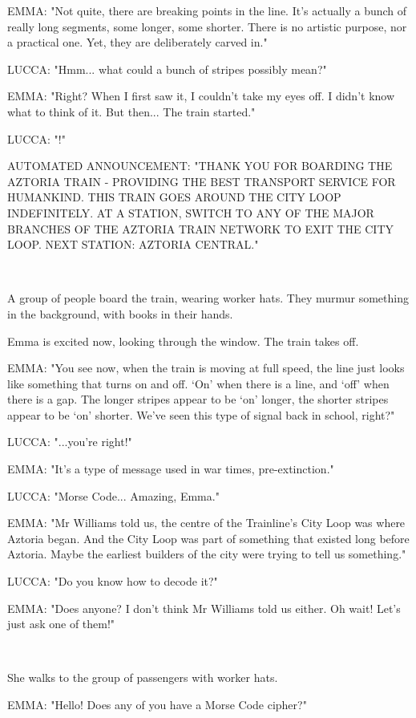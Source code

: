 \documentclass[11pt]{article}
\begin{document}
EMMA: "Not quite, there are breaking points in the line. 
It's actually a bunch of really long segments, some longer, some shorter.
There is no artistic purpose, nor a practical one.
Yet, they are deliberately carved in."

LUCCA: "Hmm... what could a bunch of stripes possibly mean?"

EMMA: "Right? When I first saw it, I couldn't take my eyes off.
I didn't know what to think of it.
But then... The train started."

LUCCA: "!"

AUTOMATED ANNOUNCEMENT: "THANK YOU FOR BOARDING THE AZTORIA TRAIN - PROVIDING THE BEST TRANSPORT SERVICE FOR HUMANKIND.
THIS TRAIN GOES AROUND THE CITY LOOP INDEFINITELY.
AT A STATION, SWITCH TO ANY OF THE MAJOR BRANCHES OF THE AZTORIA TRAIN NETWORK TO EXIT THE CITY LOOP.
NEXT STATION: AZTORIA CENTRAL."

\ 

A group of people board the train, wearing worker hats.
They murmur something in the background, with books in their hands.

Emma is excited now, looking through the window.
The train takes off.

EMMA: "You see now, when the train is moving at full speed, the line just looks like something that turns on and off.
`On' when there is a line, and `off' when there is a gap.
The longer stripes appear to be `on' longer, the shorter stripes appear to be `on' shorter.
We've seen this type of signal back in school, right?"

LUCCA: "...you're right!"

EMMA: "It's a type of message used in war times, pre-extinction."

LUCCA: "Morse Code... Amazing, Emma."

EMMA: "Mr Williams told us, the centre of the Trainline's City Loop was where Aztoria began.
And the City Loop was part of something that existed long before Aztoria.
Maybe the earliest builders of the city were trying to tell us something."

LUCCA: "Do you know how to decode it?"

EMMA: "Does anyone? I don't think Mr Williams told us either.
Oh wait! Let's just ask one of them!"

\ 

She walks to the group of passengers with worker hats.

EMMA: "Hello!
Does any of you have a Morse Code cipher?"
\end{document}
